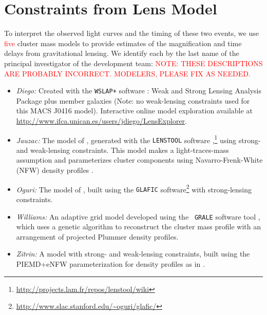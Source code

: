\section{Constraints from Lens Model}\label{sec:LensingModels}

To interpret the observed light curves and the timing of these two
events, we use \textcolor{red}{five} cluster mass models to provide
estimates of the magnification and time delays from gravitational
lensing.  We identify each by the last name of the principal
investigator of the development team:
\textcolor{red}{NOTE: THESE DESCRIPTIONS ARE PROBABLY INCORRECT.  MODELERS, PLEASE FIX AS NEEDED.}


\bigskip
\begin{itemize}
\item{\it Diego:} Created with the {\tt WSLAP+} software
  \citep{Sendra:2014}: Weak and Strong Lensing Analysis Package plus
  member galaxies (Note: no weak-lensing constraints used for this
  MACS J0416 model). Interactive online model exploration available at
  \url{http://www.ifca.unican.es/users/jdiego/LensExplorer}.
\item{{\it Jauzac:} The model of \citet{Jauzac:2014}, generated with the {\tt LENSTOOL} software
  \citep{Jullo:2007},\footnote{\url{http://projects.lam.fr/repos/lenstool/wiki}}}
  using strong- and weak-lensing constraints.  This model makes a
  light-traces-mass assumption and parameterizes cluster components
  using Navarro-Frenk-White (NFW) density profiles
  \citep{Navarro:1997}.
\item{\it Oguri:} The model of \citet{Kawamata:2015}, built using the {\tt GLAFIC} software\footnote{\url{http://www.slac.stanford.edu/~oguri/glafic/}} with strong-lensing constraints.
\item{{\it Williams:} An adaptive grid model developed using the {\tt
    GRALE} software tool
  \citep{Liesenborgs:2006,Liesenborgs:2007,Mohammed:2014}, which uses
  a genetic algorithm to reconstruct the cluster mass profile with an
  arrangement of projected Plummer \citeyear{Plummer:1911} density
  profiles.}
\item{{\it Zitrin:} A model with strong- and weak-lensing constraints, built using the PIEMD+eNFW parameterization for density profiles as in \citet{Zitrin:2009a}.}
\end{itemize}
\bigskip    


